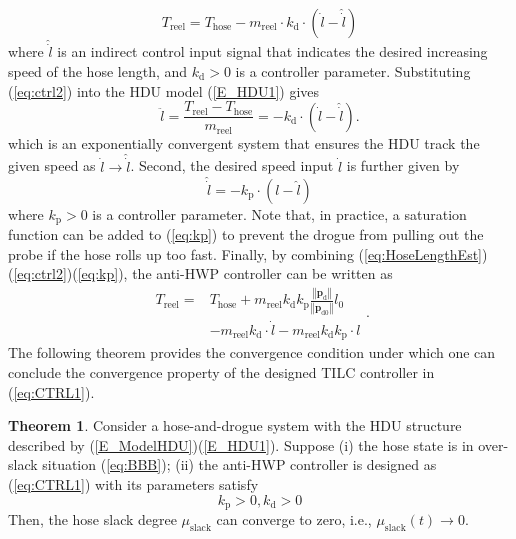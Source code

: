 \begin{equation}
T_\text{reel}=T_\text{hose}-m_\text{reel}\cdot k_{\text{d}}\cdot\left(\dot{l}-\hat{\dot{l}}\right)\label{eq:ctrl2}
\end{equation}
where $\hat{\dot{l}}$ is an indirect control input signal that indicates
the desired increasing speed of the hose length, and $k_{\text{d}}>0$ is
a controller parameter. Substituting (\ref{eq:ctrl2}) into the HDU
model (\ref{E_HDU1}) gives
\begin{equation}
\ddot{l}=\frac{T_\text{reel}-T_\text{hose}}{m_\text{reel}}=-k_{\text{d}}\cdot\left(\dot{l}-\hat{\dot{l}}\right).\label{eq:Ctrol1}
\end{equation}
which is an exponentially convergent system that ensures the HDU track
the given speed as $\dot{l}\rightarrow\hat{\dot{l}}$. Second, the
desired speed input $\hat{\dot{l}}$ is further given by
\begin{equation}
\hat{\dot{l}}=-k_\text{p}\cdot\left(l-\hat{l}\right)\label{eq:kp}
\end{equation}
where $k_\text{p}>0$ is a controller parameter. Note that, in practice,
a saturation function can be added to (\ref{eq:kp}) to prevent the
drogue from pulling out the probe if the hose rolls up too fast. Finally,
by combining (\ref{eq:HoseLengthEst})(\ref{eq:ctrl2})(\ref{eq:kp}),
the anti-HWP controller can be written as
\begin{equation}
\begin{array}{cl}
T_\text{reel}= & T_\text{hose}+m_\text{reel}k_{\text{d}}k_\text{p}\frac{\left\Vert \mathbf{p}_{\text{d}}\right\Vert }{\left\Vert \mathbf{p}_{\text{d}0}\right\Vert }l_{0}\\
& -m_\text{reel}k_{\text{d}}\cdot\dot{l}-m_\text{reel}k_{\text{d}}k_\text{p}\cdot l
\end{array}.\label{eq:CTRL1}
\end{equation}
The following theorem provides the convergence condition under which
one can conclude the convergence property of the designed TILC controller
in (\ref{eq:CTRL1}).

\textbf{Theorem 1}. Consider a hose-and-drogue system with the HDU
structure described by (\ref{E_ModelHDU})(\ref{E_HDU1}). Suppose
(i) the hose state is in over-slack situation (\ref{eq:BBB}); (ii)
the anti-HWP controller is designed as (\ref{eq:CTRL1}) with its
parameters satisfy
\begin{equation}
k_\text{p}>0,k_{\text{d}}>0
\end{equation}
Then, the hose slack degree $\mu_\text{slack}$ can converge to zero, i.e.,
$\mu_\text{slack}\left(t\right)\rightarrow0$.

